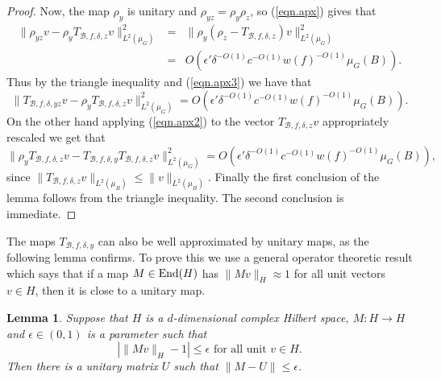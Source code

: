 \documentclass[12pt]{amsart}
\numberwithin{equation}{section}
\theoremstyle{plain}
\newtheorem{lemma}[subsection]{Lemma}
\theoremstyle{definition}
\renewcommand{\leq}{\leqslant}
\providecommand{\End}{\mathop{\rm End}\nolimits}
\begin{document}
\begin{proof}
Now, the map $\rho_y$ is unitary and $\rho_{yz}=\rho_y \rho_z$, so (\ref{eqn.apx}) gives that
\begin{eqnarray*}
\|\rho_{yz}v - \rho_yT_{\mathcal{B},f,\delta,z}v\|_{L^2(\mu_G)}^2 & = & \|\rho_y(\rho_z - T_{\mathcal{B},f,\delta,z})v\|_{L^2(\mu_G)}^2\\ & = &O(\epsilon'\delta^{-O(1)}c^{-O(1)}w(f)^{-O(1)}\mu_G(B)).
\end{eqnarray*}
Thus by the triangle inequality and (\ref{eqn.apx3}) we have that
\begin{equation*}
\|T_{\mathcal{B},f,\delta,yz}v - \rho_yT_{\mathcal{B},f,\delta,z}v\|_{L^2(\mu_G)}^2 = O(\epsilon'\delta^{-O(1)}c^{-O(1)}w(f)^{-O(1)}\mu_G(B)).
\end{equation*}
On the other hand applying (\ref{eqn.apx2}) to the vector $T_{\mathcal{B},f,\delta,z}v$ appropriately rescaled we get that
\begin{equation*}
\|\rho_yT_{\mathcal{B},f,\delta,z}v - T_{\mathcal{B},f,\delta,y}T_{\mathcal{B},f,\delta,z}v\|_{L^2(\mu_G)}^2 = O(\epsilon'\delta^{-O(1)}c^{-O(1)}w(f)^{-O(1)}\mu_G(B)),
\end{equation*}
since $\|T_{\mathcal{B},f,\delta,z}v\|_{L^2(\mu_B)} \leq \|v\|_{L^2(\mu_B)}$.  Finally the first conclusion of the lemma follows from the triangle inequality.  The second conclusion is immediate.
\end{proof}
The maps $T_{\mathcal{B},f,\delta,y}$ can also be well approximated by unitary maps, as the following lemma confirms.  To prove this we use a general operator theoretic result which says that if a map $M \in \End(H)$ has $\|Mv\|_H \approx 1$ for all unit vectors $v \in H$, then it is close to a unitary map.
\begin{lemma}\label{lem.approxunitary}
Suppose that $H$ is a $d$-dimensional complex Hilbert space, $M:H \rightarrow H$ and $\epsilon \in (0,1)$ is a parameter such that
\begin{equation*}
|\|Mv\|_H-1| \leq \epsilon \textrm{ for all unit } v \in H.
\end{equation*}
Then there is a unitary matrix $U$ such that $\|M-U\| \leq \epsilon$.
\end{lemma}
\end{document}
